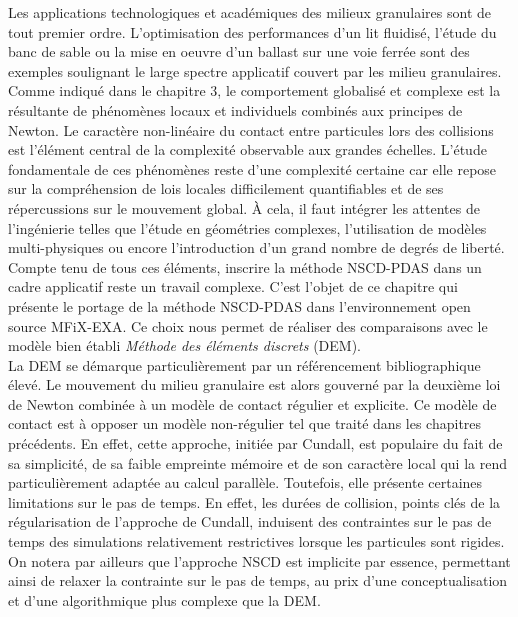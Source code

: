 Les applications technologiques et académiques des milieux granulaires sont de tout premier ordre. L'optimisation des performances d'un lit fluidisé, l'étude du banc de sable ou la mise en oeuvre d'un ballast sur une voie ferrée sont des exemples soulignant le large spectre applicatif couvert par les milieu granulaires. Comme indiqué dans le chapitre $3$, le comportement globalisé et complexe est la résultante de phénomènes locaux et individuels combinés aux principes de Newton. Le caractère non-linéaire du contact entre particules lors des collisions est l'élément central de la complexité observable aux grandes échelles. L'étude fondamentale de ces phénomènes reste d'une complexité certaine car elle repose sur la compréhension de lois locales difficilement quantifiables et de ses répercussions sur le mouvement global. À cela, il faut intégrer les attentes de l'ingénierie telles que l'étude en géométries complexes, l'utilisation de modèles multi-physiques ou encore l'introduction d'un grand nombre de degrés de liberté. Compte tenu de tous ces éléments, inscrire la méthode NSCD-PDAS dans un cadre applicatif reste un travail complexe. C'est l'objet de ce chapitre qui présente le portage de la méthode NSCD-PDAS dans l'environnement open source MFiX-EXA. Ce choix nous permet de réaliser des comparaisons avec le modèle bien établi \textit{Méthode des éléments discrets} (DEM).\\

La DEM se démarque particulièrement par un référencement bibliographique élevé. Le mouvement du milieu granulaire est alors gouverné par la deuxième loi de Newton combinée à un modèle de contact régulier et explicite. Ce modèle de contact est à opposer un modèle non-régulier tel que traité dans les chapitres précédents. En effet, cette approche, initiée par Cundall, est populaire du fait de sa simplicité, de sa faible empreinte mémoire et de son caractère local qui la rend particulièrement adaptée au calcul parallèle. Toutefois, elle présente certaines limitations sur le pas de temps. En effet, les durées de collision, points clés de la régularisation de l'approche de Cundall, induisent des contraintes sur le pas de temps des simulations relativement restrictives lorsque les particules sont rigides. On notera par ailleurs que l'approche NSCD est implicite par essence, permettant ainsi de relaxer la contrainte sur le pas de temps, au prix d'une conceptualisation et d'une algorithmique plus complexe que la DEM.\\

